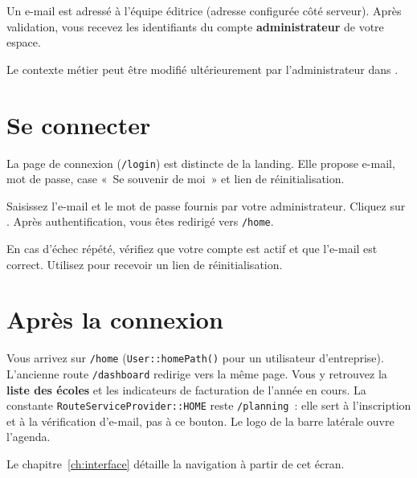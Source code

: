 Un e-mail est adressé à l'équipe éditrice (adresse configurée côté serveur). Après validation, vous recevez les identifiants du compte \textbf{administrateur} de votre espace.

\begin{astuce}
  Le contexte métier peut être modifié ultérieurement par l'administrateur dans .
\end{astuce}

\section{Se connecter}

La page de connexion (\texttt{/login}) est distincte de la landing. Elle propose e-mail, mot de passe, case «~Se souvenir de moi~» et lien de réinitialisation.


\begin{workflowstep}
  Saisissez l'e-mail et le mot de passe fournis par votre administrateur. Cliquez sur . Après authentification, vous êtes redirigé vers \texttt{/home}.
\end{workflowstep}

\begin{avertissement}
  En cas d'échec répété, vérifiez que votre compte est actif et que l'e-mail est correct. Utilisez  pour recevoir un lien de réinitialisation.
\end{avertissement}

\section{Après la connexion}

Vous arrivez sur \texttt{/home} (\texttt{User::homePath()} pour un utilisateur d'entreprise). L'ancienne route \texttt{/dashboard} redirige vers la même page. Vous y retrouvez la \textbf{liste des écoles} et les indicateurs de facturation de l'année en cours. La constante \texttt{RouteServiceProvider::HOME} reste \texttt{/planning}~: elle sert à l'inscription et à la vérification d'e-mail, pas à ce bouton. Le logo de la barre latérale ouvre l'agenda.


Le chapitre~\ref{ch:interface} détaille la navigation à partir de cet écran.
